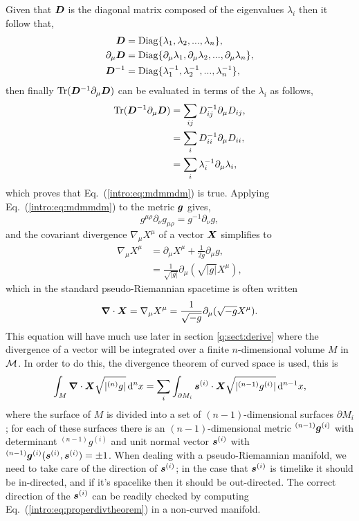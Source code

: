Given that $\boldsymbol{D}$ is the diagonal matrix composed of the eigenvalues $\lambda_i$ then it follow that,
\begin{align}
\boldsymbol{D} &= \mathrm{Diag}\{\lambda_1,\lambda_2,...,\lambda_n\} ,\\
\partial_\mu\boldsymbol{D} &= \mathrm{Diag}\{\partial_\mu\lambda_1,\partial_\mu\lambda_2,...,\partial_\mu\lambda_n\} ,\\
\boldsymbol{D}^{-1} &= \mathrm{Diag}\{\lambda^{-1}_1,\lambda^{-1}_2,...,\lambda^{-1}_n\} ,
\end{align}
then finally $\mathrm{Tr}(\boldsymbol{D}^{-1} \partial_\mu \boldsymbol{D})$ can be evaluated in terms of the $\lambda_i$ as follows,
\begin{align}
\mathrm{Tr}(\boldsymbol{D}^{-1} \partial_\mu \boldsymbol{D}) &= \sum_{ij} D^{-1}_{ij} \partial_\mu D_{ij} ,\\
&= \sum_i D^{-1}_{ii} \partial_\mu D_{ii} ,\\
&= \sum_i \lambda_i^{-1} \partial_\mu \lambda_i,
\end{align}
which proves that Eq.~(\ref{intro:eq:mdmmdm}) is true. Applying Eq.~(\ref{intro:eq:mdmmdm}) to the metric $\boldsymbol{g}$ gives,
\begin{equation} \label{intro:eq:gdggdg}
g^{\mu\rho}\partial_\nu g_{\mu\rho} = g^{-1} \partial_\nu g,
\end{equation}
and the covariant divergence $\nabla_\mu X^\mu$ of a vector $\boldsymbol{X}$ simplifies to 
\begin{align}
\nabla_\mu X^\mu &= \partial_\mu X^\mu + \frac{1}{2g}\partial_\mu g ,\\
&= \frac{1}{\sqrt{|g|}}\partial_\mu \left(\sqrt{|g|}X^\mu\right),
\end{align}
which in the standard pseudo-Riemannian spacetime is often written
\begin{equation} \label{intro:eq:div_vector}
\boldsymbol{\nabla}\cdot \boldsymbol{X} = \nabla_\mu X^\mu = \frac{1}{\sqrt{-g}}\partial_\mu (\sqrt{-g}X^\mu).
\end{equation}
This equation will have much use later in section \ref{q:sect:derive} where the divergence of a vector will be integrated over a finite $n$-dimensional volume $M$ in $\mathcal{M}$. In order to do this, the divergence theorem of curved space is used, this is 
\begin{equation} \label{intro:eq:properdivtheorem}
\int_M \boldsymbol{\nabla} \cdot \boldsymbol{X} \sqrt{|{}^{(n)}g|} \,\dd^n x = \sum_i \int_{\partial M_i} \boldsymbol{s}^{(i)} \cdot \boldsymbol{X} \sqrt{|{}^{(n-1)}g^{(i)}|} \,\dd^{n-1} x,
\end{equation}
where the surface of $M$ is divided into a set of $(n-1)$-dimensional surfaces $\partial M_i$; for each of these surfaces there is an $(n-1)$-dimensional metric ${}^{(n-1)}\boldsymbol{g}^{(i)}$ with determinant ${}^{(n-1)} g ^{(i)}$ and unit normal vector $\boldsymbol{s}^{(i)}$ with ${}^{(n-1)}\boldsymbol{g}^{(i)}(\boldsymbol{s}^{(i)},\boldsymbol{s}^{(i)})=\pm 1$. When dealing with a pseudo-Riemannian manifold, we need to take care of the direction of $\boldsymbol{s}^{(i)}$; in the case that $\boldsymbol{s}^{(i)}$ is timelike it should be in-directed, and if it's spacelike then it should be out-directed. The correct direction of the $\boldsymbol{s}^{(i)}$ can be readily checked by computing Eq.~(\ref{intro:eq:properdivtheorem}) in a non-curved manifold.



